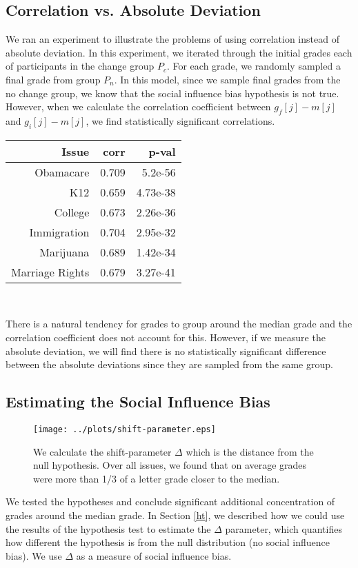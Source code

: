 \subsection{Correlation vs. Absolute Deviation}
\label{exp-robust}
We ran an experiment to illustrate the problems of using correlation instead of absolute deviation.
In this experiment, we iterated through the initial grades each of participants in the change group $P_c$.
For each grade, we randomly sampled a final grade from group $P_n$.
In this model, since we sample final grades from the no change group, we know that the social influence bias hypothesis is not true.
However, when we calculate the correlation coefficient between $g_f[j] - m[j]$ and $g_i[j] - m[j]$, we find statistically significant correlations.

{\centering
\scriptsize
\begin{tabular}[!ht] { r | r | r }
\label{ref-2}
  Issue & corr & p-val \\
  \hline
  \hline
  Obamacare &  0.709 & 5.2e-56 \\
  \hline
  K12 & 0.659 & 4.73e-38 \\
  \hline
  College & 0.673 & 2.26e-36 \\
  \hline
  Immigration & 0.704 & 2.95e-32\\
  \hline
  Marijuana & 0.689 & 1.42e-34\\
  \hline
  Marriage Rights & 0.679 & 3.27e-41 \\
\end{tabular}\\[1\baselineskip]
}
There is a natural tendency for grades to group around the median grade and the correlation coefficient does not account for this.
However, if we measure the absolute deviation, we will find there is no statistically significant difference between the absolute deviations since they are sampled from the same group.
\subsection{Estimating the Social Influence Bias}
\begin{figure}[ht!]
\centering
    \texttt{[image: ../plots/shift-parameter.eps]}
      \caption{We calculate the shift-parameter $\Delta$ which is the distance from the null hypothesis. Over all issues, we found that on average grades were more than 1/3 of a letter grade closer to the median.}
      \label{shift-1}
\end{figure}
We tested the hypotheses and conclude significant additional concentration of grades around the median grade.
In Section \ref{ht}, we described how we could use the results of the hypothesis test to estimate the $\Delta$ parameter, which quantifies how different the hypothesis is from the null distribution (no social influence bias).
We use $\Delta$ as a measure of social influence bias.

